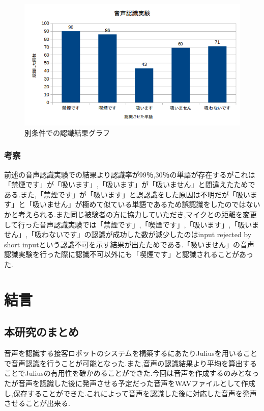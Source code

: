\documentclass[12pt,oneside]{sotsuken_paper}
\begin{document}
\begin{figure}[htbp]
\begin{center}
\includegraphics[width=150mm]{img/result2.png}
\caption{別条件での認識結果グラフ}
\label{fig:result2}
\end{center}
\end{figure}


\subsection{考察}
前述の音声認識実験での結果より認識率が99％,30％の単語が存在するがこれは「禁煙です」が「吸います」,「吸います」が「吸いません」と間違えたためである.また,「禁煙です」が「吸います」と誤認識をした原因は不明だが「吸います」と「吸いません」が極めて似ている単語であるため誤認識をしたのではないかと考えられる.また同じ被験者の方に協力していただき,マイクとの距離を変更して行った音声認識実験では「禁煙です」,「喫煙です」,「吸います」,「吸いません」,「吸わないです」の認識が成功した数が減少したのはinput rejected by short inputという認識不可を示す結果が出たためである.「吸いません」の音声認識実験を行った際に認識不可以外にも「喫煙です」と認識されることがあった.


\chapter{結言}
\section{本研究のまとめ}
音声を認識する接客ロボットのシステムを構築するにあたりJuliusを用いることで音声認識を行うことが可能となった.また,音声の認識結果より平均を算出することでJuliusの有用性を確かめることができた.今回は音声を作成するのみとなったが音声を認識した後に発声させる予定だった音声をWAVファイルとして作成し,保存することができた.これによって音声を認識した後に対応した音声を発声させることが出来る.
\end{document}
